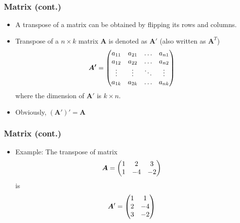 \documentclass[pdflatex, 12pt]{beamer}
\begin{document}
\begin{frame}
\frametitle{Matrix (cont.)}
\begin{itemize}
\item A transpose of a matrix can be obtained by flipping its rows and columns.
\vspace{0.4cm}
\item Transpose of a $n \times k$ matrix $\bm{A}$ is denoted as $\bm{A}'$ (also written as $\bm{A}^T$)
 \begin{equation}
 \bm{A'} = \begin{pmatrix}
 a_{11} & a_{21} & \ldots & a_{n1} \\
 a_{12} & a_{22} & \ldots & a_{n2} \\
 \vdots & \vdots & \ddots & \vdots \\
 a_{1k} & a_{2k} & \ldots & a_{nk} \\ 
 \end{pmatrix} \notag
 \end{equation} 
where the dimension of $\bm{A}'$ is $k \times n$.
\vspace{0.4cm}
\item Obviously, $(\bm{A}')' = \bm{A}$
\end{itemize}
\end{frame}

\begin{frame}
\frametitle{Matrix (cont.)}
\begin{itemize}
\item Example: The transpose of matrix 
 \begin{equation}
 \bm{A} = \begin{pmatrix}
 1 & 2 & 3 \\
 1 & -4 & -2 \\
 \end{pmatrix} \notag
 \end{equation}
is
 \begin{equation}
 \bm{A}' = \begin{pmatrix}
 1 & 1 \\
 2 & -4 \\
 3 & -2 \\
 \end{pmatrix} \notag
 \end{equation}
\end{itemize}
\end{frame}
\end{document}
